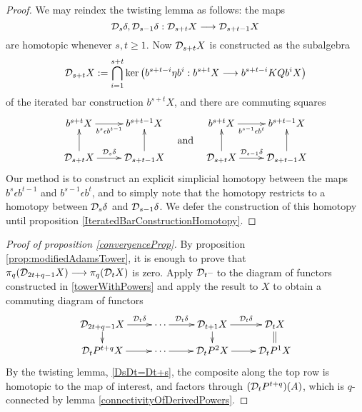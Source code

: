 \documentclass[11pt]{amsart}
\theoremstyle{plain}
\begin{document}
\begin{proof}
We may reindex the twisting lemma as follows: the maps 
\[\mathcal{D}_{\smash{s}}\delta,\mathcal{D}_{\smash{s-1}}\delta:\mathcal{D}_{\smash{s+t}}X\longrightarrow \mathcal{D}_{\smash{s+t-1}}X\]
are homotopic whenever $s,t\geq1$. Now $\mathcal{D}_{\smash{s+t}}X$ is constructed as the subalgebra
\[\mathcal{D}_{\smash{s+t}}X:=\bigcap_{i=1}^{s+t}\textup{ker}\,\!\left(b^{s+t-i}\eta b^{i}:b^{s+t}X\longrightarrow b^{s+t-i}KQb^{i}X\right)\]
of the iterated bar construction $b^{s+t}X$, and there are commuting squares
\[\xymatrix@R=7mm{
b^{s+t}X
\ar[r]_-{b^s\epsilon b^{t-1}}
&%
b^{s+t-1}X\\%
\caldup{s+t}X
\ar[r]^-{\caldup{s}\delta}
\ar[u]
&%
\caldup{s+t-1}X
\ar[u]
}\raisebox{-6mm}{\textup{\quad and\quad }}
\xymatrix@R=7mm{
b^{s+t}X
\ar[r]_-{b^{s-1}\epsilon b^{t}}
&%
b^{s+t-1}X\\%
\caldup{s+t}X
\ar[r]^-{\caldup{s-1}\delta}
\ar[u]
&%
\caldup{s+t-1}X
\ar[u]
}\]
Our method is to construct an explicit simplicial homotopy between the maps $b^s\epsilon b^{t-1}$ and $b^{s-1}\epsilon b^{t}$, and to simply note that the homotopy restricts to a homotopy between $\mathcal{D}_{\smash{s}}\delta$ and $\mathcal{D}_{\smash{s-1}}\delta$. We defer the construction of this homotopy until proposition \ref{IteratedBarConstructionHomotopy}.
\end{proof}




\begin{proof}[Proof of proposition \ref{convergenceProp}]
By proposition \ref{prop:modifiedAdamsTower}, it is enough to prove that $\pi_q(\mathcal{D}_{\smash{2t+q-1}}X)\longrightarrow\pi_q(\mathcal{D}_{\smash{t}}X)$ is zero.
Apply $\mathcal{D}_{\smash{t}}\textup{--}$ to the diagram of functors constructed in \ref{towerWithPowers} and apply the result to $X$ to obtain a commuting diagram of functors
\[\xymatrix@R=4mm{
\caldup{2t+q-1}X
\ar[r]^-{\caldup{t}\delta}
\ar[d]
&
\cdots \ar[r]^-{\caldup{t}\delta}
&%
\caldup{t+1}X
\ar[r]^-{\caldup{t}\delta}
\ar[d]&%
\caldup{t}X
\ar@{=}[d]
\\%
\caldup{t}P^{t+q}X
\ar[r]
&%
\cdots 
\ar[r]&%
\caldup{t}P^2X
\ar[r]
&%
\caldup{t}P^1X%
}\]
By the twisting lemma, \ref{DsDt=Dt+s}, the composite along the top row is homotopic to the map of interest, and factors through $(\mathcal{D}_{\smash{t}}P^{t+q})(A)$, which is $q$-connected by lemma \ref{connectivityOfDerivedPowers}.
\end{proof}
\end{document}

